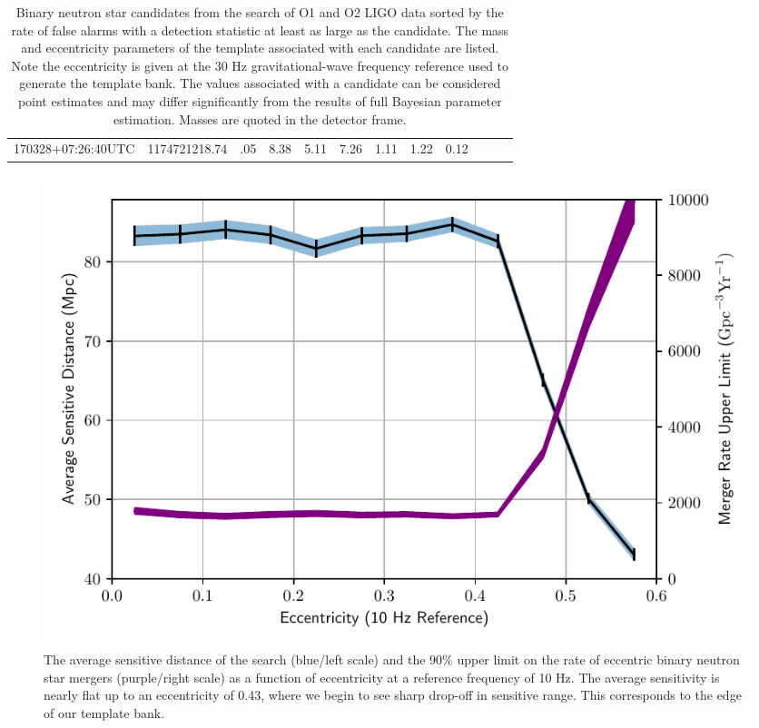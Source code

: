 \begin{table}
\begin{center}
{\begin{tabular}{ccrcrrrrrrrr}
170328+07:26:40UTC          & 1174721218.74          &        .05                     &       8.38          &       5.11          &       7.26          &       1.11          &       1.22          &       0.12         \\
\end{tabular}}
    \caption{Binary neutron star candidates from the search of O1 and O2 LIGO data sorted by the rate of false alarms with a detection statistic at least as large as the candidate. The mass and eccentricity parameters of the template associated with each candidate are listed. Note the eccentricity is given at the 30 Hz gravitational-wave frequency reference used to generate the template bank. The values associated with a candidate can be considered point estimates and may differ significantly from the results of full Bayesian parameter estimation. Masses are quoted in the detector frame.}
    \label{table:search}
  \end{center}
\end{table}

\begin{figure}[p]
  \centering
    \includegraphics[width=\textwidth]{Figures/eccentric-search/rate.pdf}
\caption{The average sensitive distance of the search (blue/left scale) and the 90$\%$ upper limit on the rate of eccentric binary neutron star mergers (purple/right scale) as a function of eccentricity at a reference frequency of 10 Hz. The average sensitivity is nearly flat up to an eccentricity of 0.43, where we begin to see sharp drop-off in sensitive range. This corresponds to the edge of our template bank.
}
\label{fig:range}
\end{figure}